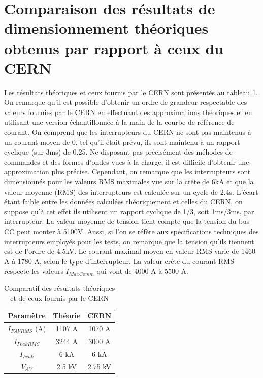 \documentclass[11pt,letterpaper,final]{report}
\begin{document}
\section{Comparaison des résultats de dimensionnement théoriques obtenus par rapport à ceux du CERN}
Les résultats théoriques et ceux fournis par le CERN sont présentés au tableau \ref{tab_comp_1}. On remarque qu'il est possible d'obtenir un ordre de grandeur respectable des valeurs fournies par le CERN en effectuant des approximations théoriques et en utilisant une version échantillonnée à la main de la courbe de référence de courant. On comprend que les interrupteurs du CERN ne sont pas maintenus à un courant moyen de 0, tel qu'il était prévu, ils sont maintenu à un rapport cyclique (sur 3ms) de 0.25. Ne disposant pas précisément des méhodes de commandes et des formes d'ondes vues à la charge, il est difficile d'obtenir une approximation plus précise. Cependant, on remarque que les interrupteurs sont dimensionnés pour les valeurs RMS maximales vue sur la crête de 6kA et que la valeur moyenne (RMS) des interrupteurs est calculée sur un cycle de 2.4s. L'écart étant faible entre les données calculées théoriquement et celles du CERN, on suppose qu'à cet effet ils utilisent un rapport cyclique de 1/3, soit 1ms/3ms, par interrupteur. La valeur moyenne de tension tient compte que la tension du bus CC peut monter à 5100V. Aussi, si l'on se réfère aux spécifications techniques des interrupteurs employés pour les tests, on remarque que la tension qu'ils tiennent est de l'ordre de 4.5kV. Le courant maximal moyen en valeur RMS varie de 1460 A à 1780 A, selon le type d'interrupteur. La valeur crête du courant RMS respecte les valeurs $I_{MaxComm}$ qui vont de 4000 A à 5500 A.

\begin{table}[htb]
\centering
\begin{tabular}{ |c|c|c| }
\hline
  Paramètre & Théorie & CERN\\\hline\hline
  $I_{FAVRMS}$ (A) & 1107 A & 1070 A \\\hline
  $I_{PeakRMS}$ & 3244 A & 3000 A \\\hline
  $I_{Peak}$ & 6 kA & 6 kA \\\hline
  $V_{AV}$ & 2.5 kV & 2.75 kV \\\hline
\end{tabular}
\caption{Comparatif des résultats théoriques et de ceux fournis par le CERN}
\label{tab_comp_1}
\end{table}
\end{document}

